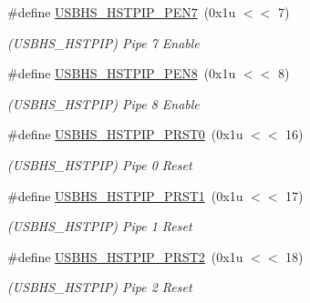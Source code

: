 \begin{DoxyCompactItemize}
\#define \mbox{\hyperlink{group__SAME70__USBHS_ga25f985d289cb1cfd228ca1829157ce2a}{U\+S\+B\+H\+S\+\_\+\+H\+S\+T\+P\+I\+P\+\_\+\+P\+E\+N7}}~(0x1u $<$$<$ 7)
\begin{DoxyCompactList}\small\item\em (U\+S\+B\+H\+S\+\_\+\+H\+S\+T\+P\+IP) Pipe 7 Enable \end{DoxyCompactList}\item 
\mbox{\label{group__SAME70__USBHS_ga0202485e22227369e96e2f379b2b22ce}} 
\#define \mbox{\hyperlink{group__SAME70__USBHS_ga0202485e22227369e96e2f379b2b22ce}{U\+S\+B\+H\+S\+\_\+\+H\+S\+T\+P\+I\+P\+\_\+\+P\+E\+N8}}~(0x1u $<$$<$ 8)
\begin{DoxyCompactList}\small\item\em (U\+S\+B\+H\+S\+\_\+\+H\+S\+T\+P\+IP) Pipe 8 Enable \end{DoxyCompactList}\item 
\mbox{\label{group__SAME70__USBHS_ga42f2334a1965f0ea164c16c7846a76e1}} 
\#define \mbox{\hyperlink{group__SAME70__USBHS_ga42f2334a1965f0ea164c16c7846a76e1}{U\+S\+B\+H\+S\+\_\+\+H\+S\+T\+P\+I\+P\+\_\+\+P\+R\+S\+T0}}~(0x1u $<$$<$ 16)
\begin{DoxyCompactList}\small\item\em (U\+S\+B\+H\+S\+\_\+\+H\+S\+T\+P\+IP) Pipe 0 Reset \end{DoxyCompactList}\item 
\mbox{\label{group__SAME70__USBHS_ga5c4319ddf947a1ff53fd19f6221ba6f9}} 
\#define \mbox{\hyperlink{group__SAME70__USBHS_ga5c4319ddf947a1ff53fd19f6221ba6f9}{U\+S\+B\+H\+S\+\_\+\+H\+S\+T\+P\+I\+P\+\_\+\+P\+R\+S\+T1}}~(0x1u $<$$<$ 17)
\begin{DoxyCompactList}\small\item\em (U\+S\+B\+H\+S\+\_\+\+H\+S\+T\+P\+IP) Pipe 1 Reset \end{DoxyCompactList}\item 
\mbox{\label{group__SAME70__USBHS_ga1f8fa4b5f8a83efb290859bac8f771c5}} 
\#define \mbox{\hyperlink{group__SAME70__USBHS_ga1f8fa4b5f8a83efb290859bac8f771c5}{U\+S\+B\+H\+S\+\_\+\+H\+S\+T\+P\+I\+P\+\_\+\+P\+R\+S\+T2}}~(0x1u $<$$<$ 18)
\begin{DoxyCompactList}\small\item\em (U\+S\+B\+H\+S\+\_\+\+H\+S\+T\+P\+IP) Pipe 2 Reset \end{DoxyCompactList}\item 
$$
\end{DoxyCompactItemize}
